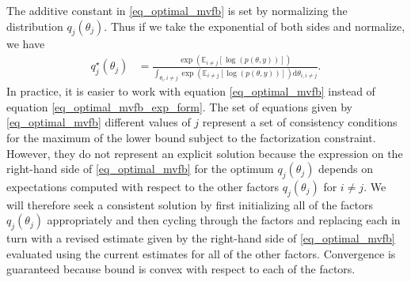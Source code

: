 \documentclass[10pt ]{article}
\begin{document}
The additive constant in \eqref{eq_optimal_mvfb} is set by normalizing the distribution $q_j(\theta_j)$. Thus if we take the exponential of both sides and normalize, we have
\begin{align}
 q_{j}^{\star} \left( \theta_j \right)  &=\frac{\exp \left( \mathbb{E}_{i \neq j} \left[ \log \left( p(\theta, y) \right) \right]  \right)}{\int_{\theta_i, i \neq j} \exp \left( \mathbb{E}_{i \neq j} \left[ \log \left( p(\theta, y) \right) \right]  \right) \mathrm{d} \theta_{i, i\neq j}}. 
\label{eq_optimal_mvfb_exp_form}
\end{align}
In practice, it is easier to work with equation \eqref{eq_optimal_mvfb} instead of equation \eqref{eq_optimal_mvfb_exp_form}. The set of equations given by \eqref{eq_optimal_mvfb} different values of $j$ represent a set of consistency conditions for the maximum of the lower bound subject to the factorization constraint. However, they do not represent an explicit solution because the expression on the right-hand side of \eqref{eq_optimal_mvfb} for the optimum $q_j(\theta_j)$ depends on expectations computed with respect to the other factors $q_j(\theta_j)$ for $i \neq j$. We will therefore seek a consistent solution by first initializing all of the factors $q_j(\theta_j)$ appropriately and then cycling through the factors and replacing each in turn with a revised estimate given by the right-hand side of \eqref{eq_optimal_mvfb} evaluated using the current estimates for all of the other factors. Convergence is guaranteed because bound is convex with respect to each of the factors.
\end{document}
